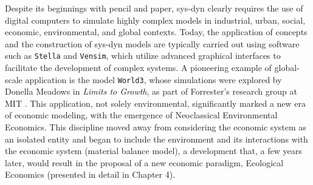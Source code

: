 \documentclass[./main_en.tex]{subfiles}
\begin{document}
\noindent Despite its beginnings with pencil and paper, \gls{sys-dyn} clearly requires the use of digital computers to simulate highly complex models in industrial, urban, social, economic, environmental, and global contexts. Today, the application of concepts and the construction of \gls{sys-dyn} models are typically carried out using software such as \texttt{Stella} and \texttt{Vensim}, which utilize advanced graphical interfaces to facilitate the development of complex systems. A pioneering example of global-scale application is the \gls{model} \texttt{World3}, whose simulations were explored by Donella Meadows in \textit{Limits to Growth}, as part of Forrester's research group at MIT \cite{meadows1974}. This application, not solely environmental, significantly marked a new era of economic modeling, with the emergence of Neoclassical Environmental Economics. This discipline moved away from considering the economic system as an isolated entity and began to include the environment and its interactions with the economic system (material balance model), a development that, a few years later, would result in the proposal of a new economic paradigm, Ecological Economics (presented in detail in Chapter 4).
\end{document}
